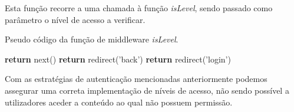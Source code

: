 Esta função recorre a uma chamada à função \emph{isLevel}, sendo passado como parâmetro o nível de acesso a verificar.

\begin{algorithm}
    \caption{Pseudo código da função de middleware \emph{isLevel}.}
    \begin{algorithmic}[1]
                \State \textbf{return} next()
            \Else
                \State \textbf{return} redirect('back')
            \EndIf
        \Else
            \State \textbf{return} redirect('login')
        \EndIf
    \EndFunction
    \end{algorithmic}
\end{algorithm}

Com as estratégias de autenticação mencionadas anteriormente podemos assegurar uma correta implementação de níveis de acesso, não sendo possível a utilizadores aceder a conteúdo ao qual não possuem permissão.